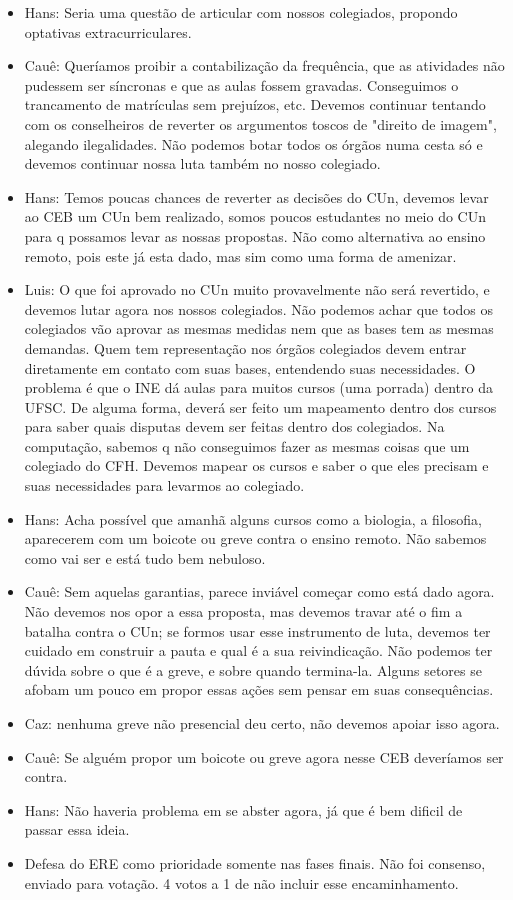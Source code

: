 \documentclass{ata-calico}
\begin{document}
\begin{itemize}
\item Hans: Seria uma questão de articular com nossos colegiados, propondo optativas extracurriculares.
\item Cauê: Queríamos proibir a contabilização da frequência, que as atividades não pudessem ser síncronas e que as aulas fossem gravadas. Conseguimos o trancamento de matrículas sem prejuízos, etc. Devemos continuar tentando com os conselheiros de reverter os argumentos toscos de "direito de imagem", alegando ilegalidades. Não podemos botar todos os órgãos numa cesta só e devemos continuar nossa luta também no nosso colegiado.
\item Hans: Temos poucas chances de reverter as decisões do CUn, devemos levar ao CEB um CUn bem realizado, somos poucos estudantes no meio do CUn para q possamos levar as nossas propostas. Não como alternativa ao ensino remoto, pois este já esta dado, mas sim como uma forma de amenizar.
\item Luis: O que foi aprovado no CUn muito provavelmente não será revertido, e devemos lutar agora nos nossos colegiados. Não podemos achar que todos os colegiados vão aprovar as mesmas medidas nem que as bases tem as mesmas demandas. Quem tem representação nos órgãos colegiados devem entrar diretamente em contato com suas bases, entendendo suas necessidades. O problema é que o INE dá aulas para muitos cursos (uma porrada) dentro da UFSC. De alguma forma, deverá ser feito um mapeamento dentro dos cursos para saber quais disputas devem ser feitas dentro dos colegiados. Na computação, sabemos q não conseguimos fazer as mesmas coisas que um colegiado do CFH. Devemos mapear os cursos e saber o que eles precisam e suas necessidades para levarmos ao colegiado.
\end{itemize}

\begin{itemize}
\item Hans: Acha possível que amanhã alguns cursos como a biologia, a filosofia, aparecerem com um boicote ou greve contra o ensino remoto. Não sabemos como vai ser e está tudo bem nebuloso.
\item Cauê: Sem aquelas garantias, parece inviável começar como está dado agora. Não devemos nos opor a essa proposta, mas devemos travar até o fim a batalha contra o CUn; se formos usar esse instrumento de luta, devemos ter cuidado em construir a pauta e qual é a sua reivindicação. Não podemos ter dúvida sobre o que é a greve, e sobre quando termina-la. Alguns setores se afobam um pouco em propor essas ações sem pensar em suas consequências.
\item Caz: nenhuma greve não presencial deu certo, não devemos apoiar isso agora.
\item Cauê: Se alguém propor um boicote ou greve agora nesse CEB deveríamos ser contra.
\item Hans: Não haveria problema em se abster agora, já que é bem dificil de passar essa ideia.
\item Defesa do ERE como prioridade somente nas fases finais. Não foi consenso, enviado para votação. 4 votos a 1 de não incluir esse encaminhamento.
\end{itemize}
\end{document}
